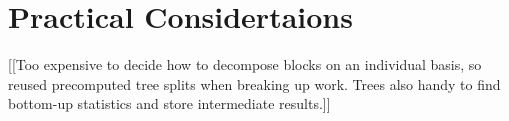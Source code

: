 \documentclass{article}
\newcommand{\GNP}[1][\psi]{{#1}_{\Theta}}
\newcommand{\otimeshat}{\mathbin{\widehat{\otimes}}}
\newcommand{\odothat}{\mathbin{\widehat{\odot}}}
\newcommand{\otimestilde}{\mathbin{\widetilde{\otimes}}}
\newcommand{\odottilde}{\mathbin{\widetilde{\odot}}}
\newcommand{\bigotimestilde}{\mathop{\widetilde{\bigotimes}}}
\newcommand{\bigodottilde}{\mathop{\widetilde{\bigodot}}}
\begin{document}


\section{Practical Considertaions}

[[Too expensive to decide how to decompose blocks on an individual
basis, so reused precomputed tree splits when breaking up work.  Trees
also handy to find bottom-up statistics and store intermediate
results.]]

\appendix
\end{document}
